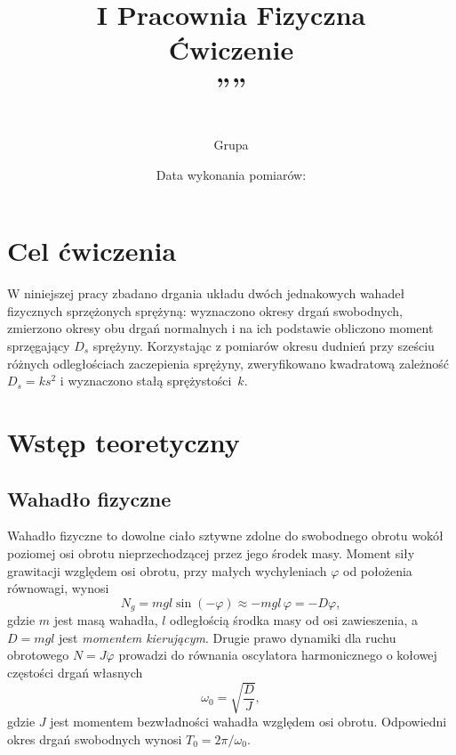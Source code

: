\documentclass[12pt, a4paper]{article}
\title{
    \large I Pracownia Fizyczna \\[0.5em]
    \textbf{Ćwiczenie \nrCwiczenia} \\[0.3em]
    \LARGE \tytul\space''\codeword''
}
\author{
    \autor\\
     Grupa \nrGrupy}
\date{
    Data wykonania pomiarów: \dataWykonania\\
}
\begin{document}

\maketitle
\thispagestyle{empty}
\newpage

\section{Cel ćwiczenia}

W niniejszej pracy zbadano drgania układu dwóch jednakowych wahadeł fizycznych sprzężonych sprężyną:
wyznaczono okresy drgań swobodnych, zmierzono okresy obu drgań normalnych
i na ich podstawie obliczono moment sprzęgający $D_s$ sprężyny.
Korzystając z pomiarów okresu dudnień przy sześciu różnych odległościach zaczepienia
sprężyny, zweryfikowano kwadratową zależność $D_s = ks^2$ i wyznaczono stałą sprężystości~$k$.

\section{Wstęp teoretyczny}

\subsection{Wahadło fizyczne}

Wahadło fizyczne to dowolne ciało sztywne zdolne do swobodnego obrotu wokół poziomej
osi obrotu nieprzechodzącej przez jego środek masy.
Moment siły grawitacji względem osi obrotu, przy małych wychyleniach $\varphi$
od położenia równowagi, wynosi
\begin{equation}
    N_g = mgl\sin(-\varphi) \approx -mgl\,\varphi = -D\varphi,
    \label{eq:Ng}
\end{equation}
gdzie $m$ jest masą wahadła, $l$ odległością środka masy od osi zawieszenia,
a $D = mgl$ jest \emph{momentem kierującym}. Drugie prawo dynamiki dla ruchu
obrotowego $N = J\ddot{\varphi}$ prowadzi do równania oscylatora harmonicznego
o kołowej częstości drgań własnych
\begin{equation}
    \omega_0 = \sqrt{\frac{D}{J}},
    \label{eq:omega0}
\end{equation}
gdzie $J$ jest momentem bezwładności wahadła względem osi obrotu.
Odpowiedni okres drgań swobodnych wynosi $T_0 = 2\pi/\omega_0$.
\end{document}
